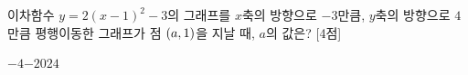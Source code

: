 이차함수 $y=2(x-1)^2-3$의 그래프를 $x$축의 방향으로 $-3$만큼, $y$축의 방향으로 $4$만큼 평행이동한 그래프가 점 $(a{,}\mkern3mu 1)$을 지날 때, $a$의 값은? \mbox{[4점]}
\begin{choices32}{$-4$}{$-2$}{$0$}{$2$}{$4$}\end{choices32}
